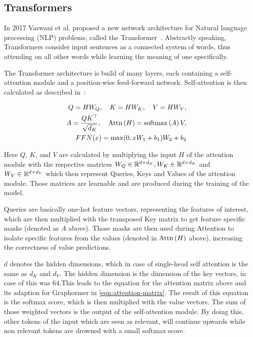 \subsection{Transformers}
In 2017 Vaswani et al. proposed a new network architecture for Natural language processing (NLP) problems, called the Transformer~\cite{vaswani2017attention}. Abstractly speaking, Transformers consider input sentences as a connected system of words, thus attending on all other words while learning the meaning of one specifically.

The Transformer architecture is build of many layers, each containing a self-attention module and a position-wise feed-forward network. Self-attention is then calculated as described in~\cite{2021graphormer}:

\begin{align}
    Q = HW_Q,\quad K = HW_K,\quad V = HW_V,\label{eqn:attention-alpha} \\
    A = \frac{QK^\top}{\sqrt{d_K}}, \quad \mathrm{Attn}\left(H\right) = \mathrm{softmax}\left(A\right)V,     \\
    FFN(x) = \max(0,xW_1 + b_1)W_2 + b_2
    \label{eqn:attention-alpha2}
\end{align}

Here $Q$, $K$, and $V$ are calculated by multiplying the input $H$ of the attention module with the respective matrices $W_Q\in\mathbb{R}^{d\times d_K}, W_K\in\mathbb{R}^{d\times d_K}$ and $ W_V\in\mathbb{R}^{d\times d_V}$ which then represent Queries, Keys and Values of the attention module. Those matrices are learnable and are produced during the training of the model.

Queries are basically one-hot feature vectors, representing the features of interest, which are then multiplied with the transposed Key matrix to get feature specific masks (denoted as $A$ above). Those masks are then used during Attention to isolate specific features from the values (denoted in $\mathrm{Attn}\left(H\right)$ above), increasing the correctness of value predictions.

$d$ denotes the hidden dimensions, which in case of single-head self attention is the same as $d_K$ and $d_V$. The hidden dimension is the dimension of the key vectors, in case of \cite{vaswani2017attention} this was $64$.This leads to the equation for the attention matrix above and its adaption for Graphormer in \autoref{eqn:attention-matrix}. The result of this equation is the softmax score, which is then multiplied with the value vectors. The sum of those weighted vectors is the output of the self-attention module. By doing this, other tokens of the input which are seen as relevant, will continue upwards while non relevant tokens are drowned with a small softmax score.

